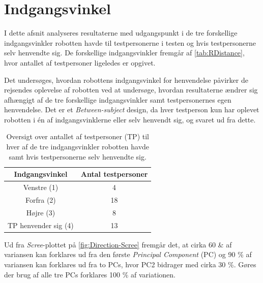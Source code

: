 \section{Indgangsvinkel}
\label{DatabehandlingRIndgangsvinkel}
%
I dette afsnit analyseres resultaterne med udgangspunkt i de tre forskellige indgangsvinkler robotten havde til testpersonerne i testen og hvis testpersonerne selv henvendte sig. De forskellige indgangsvinkler fremgår af \autoref{tab:RDistance}, hvor antallet af testpersoner ligeledes er opgivet. 

Det undersøges, hvordan robottens indgangsvinkel for henvendelse påvirker de rejsendes oplevelse af robotten ved at undersøge, hvordan resultaterne ændrer sig afhængigt af de tre forskellige indgangsvinkler samt testpersonernes egen henvendelse. Det er et \textit{Between-subject} design, da hver testperson kun har oplevet robotten i én af indgangsvinklerne eller selv henvendt sig, og svaret ud fra dette.
%
\begin{table}[H]
\centering
\begin{tabular}{c|c}
Indgangsvinkel & Antal testpersoner \\ \hline
Venstre (1) & 4    \\ \hline
Forfra (2) & 18    \\ \hline
Højre (3) & 8     \\ \hline
TP henvender sig (4) & 13 \\
\end{tabular}
\caption{Oversigt over antallet af testpersoner (TP) til hver af de tre indgangsvinkler robotten havde samt hvis testpersonerne selv henvendte sig.}
\label{tab:RDirection}
\end{table}
\noindent
%
Ud fra \textit{Scree}-plottet på \autoref{fig:Direction-Scree} fremgår det, at cirka 60 \& af variansen kan forklares ud fra den første \textit{Principal Component} (PC) og 90 \% af variansen kan forklares ud fra to PCs, hvor PC2 bidrager med cirka 30 \%. Gøres der brug af alle tre PCs forklares 100 \% af variationen. 
%
